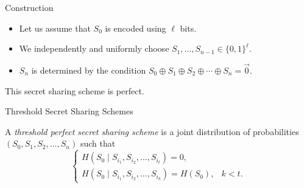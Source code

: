 \documentclass[aspectratio=169]{beamer}
\newcommand{\pitem}{\pause\item}
\newcommand{\seqn}[2]{{#1}_1,{#1}_2,\dotsc,{#1}_{#2}}
\newcommand{\seqin}[3]{{#1}_{{#2}_1},{#1}_{{#2}_2},\dotsc,{#1}_{{#2}_{#3}}}
\begin{document}
\begin{frame}{Construction}
    \begin{itemize}
        \item Let us assume that $S_0$ is encoded using $\ell$ bits.
        \pitem We independently and uniformly choose $S_1, \dotsc, S_{n-1} \in \{0,1\}^\ell$.
        \pitem $S_n$ is determined by the condition $S_0 \oplus S_1 \oplus S_2 \oplus \dotsb \oplus S_n = \vec 0$.
    \end{itemize}

    \pause
    \begin{theorem}
        This secret sharing scheme is perfect.
    \end{theorem}

\end{frame}

\begin{frame}{Threshold Secret Sharing Schemes}
\begin{definition}
    A \emph{threshold perfect secret sharing scheme} is a joint distribution of probabilities $(S_0, \seqn{S}{n})$ such that
    \[
    \begin{cases}
        H(S_0 \mid \seqin{S}{i}{t}) = 0,\\
        H(S_0 \mid \seqin{S}{i}{k}) = H(S_0), & k < t.
    \end{cases}
    \]
\end{definition}


\end{frame}
\end{document}
